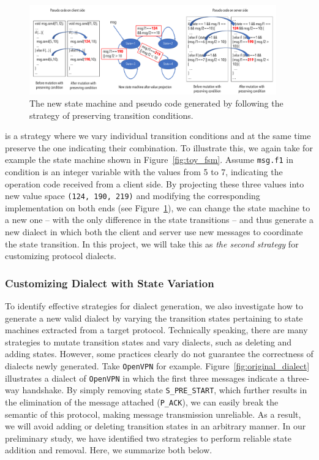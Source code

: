 \begin{figure}
  \centering
  \includegraphics[width=0.95\textwidth]{figure/shuffle}
  \caption{The new state machine and pseudo code generated by following the
  strategy of preserving transition conditions.}
  \vspace{-0.1in} 
  \label{fig:toy_shuffle}
\end{figure}

 is a strategy  where we
vary individual transition conditions and at the same time preserve the one
indicating their combination. To illustrate this, we again take for example the
state machine shown in Figure~\ref{fig:toy_fsm}. Assume \texttt{msg.f1} in
condition  is an integer variable with the values
from 5 to 7, indicating the operation code received from a client side. By
projecting these three values into new value space \texttt{(124, 190, 219)} and modifying the
corresponding implementation on both ends (see Figure~\ref{fig:toy_shuffle}), we
can change the state machine to a new one -- with the only difference in the
state transitions -- and thus generate a new dialect in which both the client
and server use new messages to coordinate the state transition. In this project,
we will take this as \emph{the second strategy} for customizing protocol
dialects.

\subsubsection{Customizing Dialect with State Variation}

To identify effective strategies for dialect generation, we also investigate how
to generate a new valid dialect by varying the transition states pertaining to
state machines extracted from a target protocol. Technically speaking, there are
many strategies to mutate transition states and vary dialects, such as deleting
and adding states. However, some practices clearly do not guarantee the
correctness of dialects newly generated. Take \texttt{OpenVPN} for example.
Figure~\ref{fig:original_dialect} illustrates a dialect of \texttt{OpenVPN} in
which the first three messages indicate a three-way handshake. By simply
removing state \texttt{S\_PRE\_START}, which further results in the elimination
of the message attached (\texttt{P\_ACK}), we can easily break the semantic of
this protocol, making message transmission unreliable. As a result, we will
avoid adding or deleting transition states in an arbitrary manner. In our
preliminary study, we have identified two strategies to perform reliable state
addition and removal. Here, we summarize both below.

